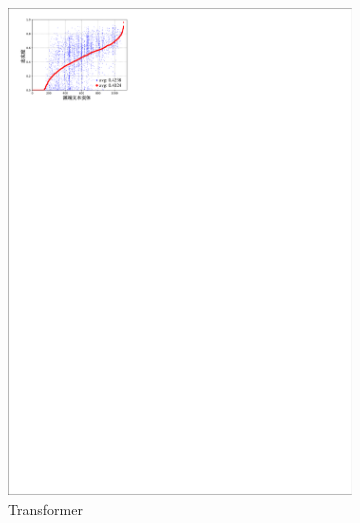 
\begin{figure}[!htbp]
    \centering
    \begin{subfigure}[b]{0.45\textwidth}
      \includegraphics[width=\textwidth]{Img/fig_4_fidelity_base.pdf}
      \caption{Transformer}
      \label{fig:4_fidelity_base}
    \end{subfigure}%
    ~%
    \begin{subfigure}[b]{0.45\textwidth}

\end{subfigure}
\end{figure}
